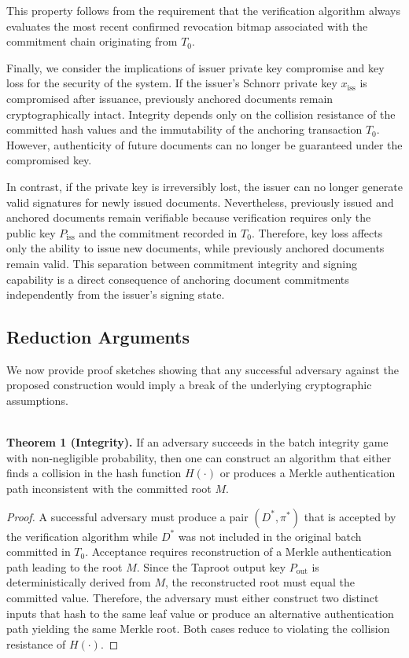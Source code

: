 \documentclass[preprint,12pt]{elsarticle}
\begin{document}
This property follows from the requirement that the verification algorithm always evaluates the most recent confirmed revocation bitmap associated with the commitment chain originating from $T_0$.

Finally, we consider the implications of issuer private key compromise and key loss for the security of the system. If the issuer's Schnorr private key $x_{\mathrm{iss}}$ is compromised after issuance, previously anchored documents remain cryptographically intact. Integrity depends only on the collision resistance of the committed hash values and the immutability of the anchoring transaction $T_0$. However, authenticity of future documents can no longer be guaranteed under the compromised key.

In contrast, if the private key is irreversibly lost, the issuer can no longer generate valid signatures for newly issued documents. Nevertheless, previously issued and anchored documents remain verifiable because verification requires only the public key $P_{\mathrm{iss}}$ and the commitment recorded in $T_0$. Therefore, key loss affects only the ability to issue new documents, while previously anchored documents remain valid. This separation between commitment integrity and signing capability is a direct consequence of anchoring document commitments independently from the issuer's signing state.

\subsection{Reduction Arguments}

We now provide proof sketches showing that any successful adversary against the proposed construction would imply a break of the underlying cryptographic assumptions.

\textbf{\\Theorem 1 (Integrity).}  
If an adversary succeeds in the batch integrity game with non-negligible probability, then one can construct an algorithm that either finds a collision in the hash function $H(\cdot)$ or produces a Merkle authentication path inconsistent with the committed root $M$.

\begin{proof}
A successful adversary must produce a pair $(D^*, \pi^*)$ that is accepted by the verification algorithm while $D^*$ was not included in the original batch committed in $T_0$. Acceptance requires reconstruction of a Merkle authentication path leading to the root $M$. Since the Taproot output key $P_{\mathrm{out}}$ is deterministically derived from $M$, the reconstructed root must equal the committed value. Therefore, the adversary must either construct two distinct inputs that hash to the same leaf value or produce an alternative authentication path yielding the same Merkle root. Both cases reduce to violating the collision resistance of $H(\cdot)$.
\end{proof}
\end{document}
